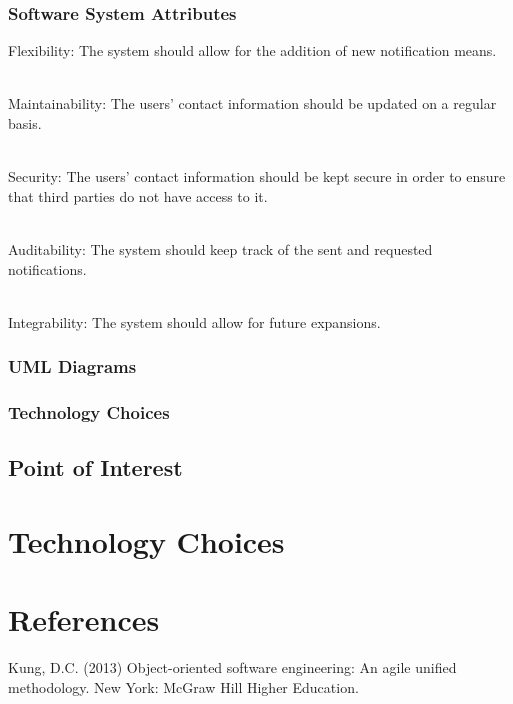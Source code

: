 \documentclass[runningheads,a4paper]{article}
\begin{document}
\subsubsection{Software System Attributes}

Flexibility: The system should allow for the addition of new notification means.

\\

Maintainability: The users’ contact information should be updated on a regular basis.

\\

Security: The users’ contact information should be kept secure in order to ensure that third parties do not have access to it.

\\

Auditability: The system should keep track of the sent and requested notifications.

\\

Integrability: The system should allow for future expansions.

\subsubsection{UML Diagrams}

\subsubsection{Technology Choices}



\subsection {Point of Interest}



\section{Technology Choices}



\section{References}

Kung, D.C. (2013) Object-oriented software engineering: An agile unified methodology. New York: McGraw Hill Higher Education.
\end{document}
